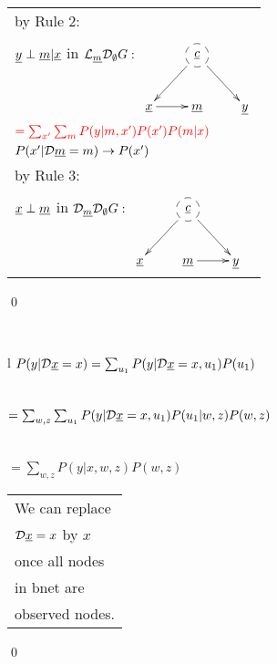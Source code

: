 \begin{longtable}{l}
\quad by Rule 2:
\begin{tabular}{l}
\\
\end{tabular}
\\
\quad
${\underline{y}}\perp{\underline{m}}|{\underline{x}}$ in
${\cal L}_{\underline{m}} {\cal D}_\emptyset G:$
$\xymatrix{
&*++[F-o]{\rvc}\ar[rd]\ar[ld]
\\
\rvx\ar[r]
&\rvm
&\rvy
}$
\\
$\color{red}=
\sum_{x'}
\sum_m
P(y|m, x')
P(x')
P(m|x)$
\\
\quad $P(x'|{\cal D}{\underline{m}}=m)
\rightarrow
P(x')$
\\
\quad by Rule 3:
\begin{tabular}{l}
\\
\end{tabular}
\\
\quad
${\underline{x}}\perp{\underline{m}}$ in
${\cal D}_{\underline{m}} {\cal D}_\emptyset G:$
$\xymatrix{
&*++[F-o]{\rvc}\ar[rd]\ar[ld]
\\
\rvx
&\rvm\ar[r]
&\rvy
}$
\end{longtable}
\qed



\begin{claim}
\label{cl-decNapkin}
\decNapkin
\end{claim}
\proof
\\
\begin{longtable}{l}
\color{red}
$P(y|{\cal D}{\underline{x}}=x)=
\sum_{u_1}P(y|{\cal D}{\underline{x}}=x, u_1)P(u_1)$
\\
\\
\xymatrix{\\=}
\quad
{}
\\
\color{red}
$
=\sum_{w,z}\sum_{u_1}P(y|{\cal D}{\underline{x}}=x, u_1)P(u_1|w,z)
P(w,z)$
\\
\\
\xymatrix{\\=}
\\
\color{red}
$
=\sum_{w,z}P(y|x,w,z)
P(w,z)$
\\
\xymatrix{
\\=}
\begin{tabular}{l}
We can replace\\
${\cal D}{\underline{x}}=x$
by $x$ 
\\once all nodes
\\in bnet are
\\observed nodes. 
\end{tabular}
\end{longtable}
\qed


